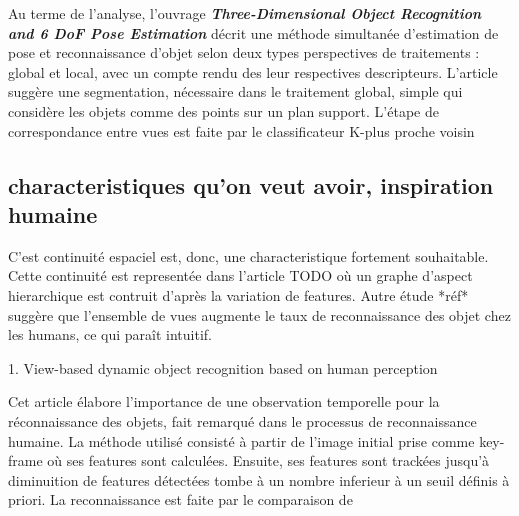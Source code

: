 	Au terme de l'analyse, l'ouvrage \textbf{\textit{Three-Dimensional Object Recognition and 6 DoF Pose Estimation}} décrit une méthode simultanée d'estimation de pose et reconnaissance d'objet selon deux types perspectives de traitements : global et local, avec un compte rendu des leur respectives descripteurs. L'article suggère une segmentation, nécessaire dans le traitement global, simple qui considère les objets comme des points sur un plan support. L'étape de correspondance entre vues est faite par le classificateur K-plus proche voisin 

{\color{green}

\subsection{characteristiques qu'on veut avoir, inspiration humaine} 

C'est continuité espaciel est, donc, une characteristique fortement souhaitable. Cette continuité est representée dans l'article {\color{red} TODO} où un graphe d'aspect hierarchique est contruit d'après la variation de features. Autre étude *réf* suggère que l'ensemble de vues augmente le taux de reconnaissance des objet chez les humans, ce qui paraît intuitif.


1. View-based dynamic object recognition based on human perception 

Cet article élabore l'importance de une observation temporelle pour la réconnaissance des objets, fait remarqué dans le processus de reconnaissance humaine.
La méthode utilisé consisté à partir de l'image initial prise comme key-frame où ses features sont calculées. Ensuite, ses features sont trackées jusqu'à diminuition de features détectées tombe à un nombre inferieur à un seuil définis à priori. La reconnaissance est faite par le comparaison de 
}

